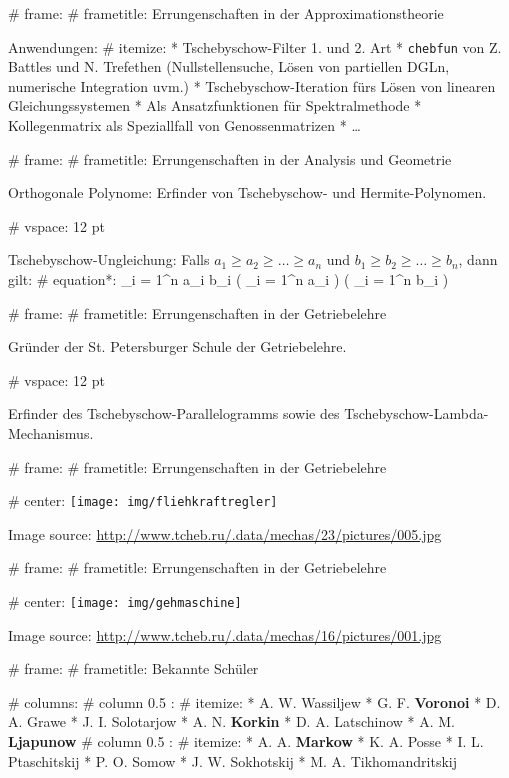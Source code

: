 # frame:
  # frametitle: Errungenschaften in der Approximationstheorie

  Anwendungen:
  # itemize:
    * Tschebyschow-Filter 1. und 2. Art
    * \texttt{chebfun} von Z. Battles und N. Trefethen
      (Nullstellensuche, Lösen von partiellen DGLn, numerische Integration uvm.)
    * Tschebyschow-Iteration fürs Lösen von linearen Gleichungssystemen
    * Als Ansatzfunktionen für Spektralmethode
    * Kollegenmatrix als Speziallfall von Genossenmatrizen
    * \ldots

# frame:
  # frametitle: Errungenschaften in der Analysis und Geometrie

  Orthogonale Polynome: Erfinder von Tschebyschow- und Hermite-Polynomen.

  # vspace: 12 pt

  Tschebyschow-Ungleichung:
  Falls $a_1 \geqslant a_2 \geqslant \ldots \geqslant a_n$ und
  $b_1 \geqslant b_2 \geqslant \ldots \geqslant b_n$, dann gilt:
  # equation*:
     \sum_{i = 1}^n a_i b_i
    \geqslant
    \left(  \sum_{i = 1}^n a_i \right)
    \left(  \sum_{i = 1}^n b_i \right)

%
%
%

# frame:
  # frametitle: Errungenschaften in der Getriebelehre

  Gründer der St. Petersburger Schule der Getriebelehre.

  # vspace: 12 pt

  Erfinder des Tschebyschow-Parallelogramms sowie des Tschebyschow-Lambda-Mechanismus.

# frame:
  # frametitle: Errungenschaften in der Getriebelehre

  # center:
    \texttt{[image: img/fliehkraftregler]}

  \color{mDarkTeal!40!white}
  \tiny{Image source: \url{http://www.tcheb.ru/.data/mechas/23/pictures/005.jpg}}

# frame:
  # frametitle: Errungenschaften in der Getriebelehre

  # center:
    \texttt{[image: img/gehmaschine]}

  \color{mDarkTeal!40!white}
  \tiny{Image source: \url{http://www.tcheb.ru/.data/mechas/16/pictures/001.jpg}}

# frame:
  # frametitle: Bekannte Schüler

  # columns:
    # column {0.5 \textwidth}:
      # itemize:
        * A. W. Wassiljew
        * G. F. \textbf{Voronoi}
        * D. A. Grawe
        * J. I. Solotarjow
        * A. N. \textbf{Korkin}
        * D. A. Latschinow
        * A. M. \textbf{Ljapunow}
    # column {0.5 \textwidth}:
      # itemize:
        * A. A. \textbf{Markow}
        * K. A. Posse
        * I. L. Ptaschitskij
        * P. O. Somow
        * J. W. Sokhotskij
        * M. A. Tikhomandritskij
